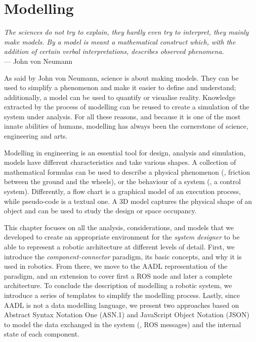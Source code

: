 \chapter[Modelling]{Modelling}\label{ch:Modelling}

\begin{flushright}{\slshape The sciences do not try to explain, they hardly even try to interpret, they mainly make models. By a model is meant a mathematical construct which, with the addition of certain verbal interpretations, describes observed phenomena.} \\ \medskip
    --- John  von Neumann
\end{flushright}

As said by John von Neumann, science is about making models. They can be used to simplify a phenomenon and make it easier to define and understand; additionally, a model can be used to quantify or visualise reality. Knowledge extracted by the process of modelling can be reused to create a simulation of the system under analysis. For all these reasons, and because it is one of the most innate abilities of humans, modelling has always been the cornerstone of science, engineering and arts.

Modelling in engineering is an essential tool for design, analysis and simulation, models have different characteristics and take various shapes. A collection of mathematical formulas can be used to describe a physical phenomenon (\eg, friction between the ground and the wheels), or the behaviour of a system (\eg, a control system). Differently, a flow chart is a graphical model of an execution process, while pseudo-code is a textual one. A 3D model captures the physical shape of an object and can be used to study the design or space occupancy.

This chapter focuses on all the analysis, considerations, and models that we developed to create an appropriate environment for the \textit{system designer} to be able to represent a robotic architecture at different levels of detail. First, we introduce the \textit{component-connector} paradigm, its basic concepts, and why it is used in robotics. From there, we move to the AADL representation of the paradigm, and an extension to cover first a ROS node and later a complete architecture. To conclude the description of modelling a robotic system, we introduce a series of templates to simplify the modelling process. Lastly, since AADL is not a data modelling language, we present two approaches based on Abstract Syntax Notation One (ASN.1) and JavaScript Object Notation (JSON) to model the data exchanged in the system (\ie, ROS messages) and the internal state of each component.

